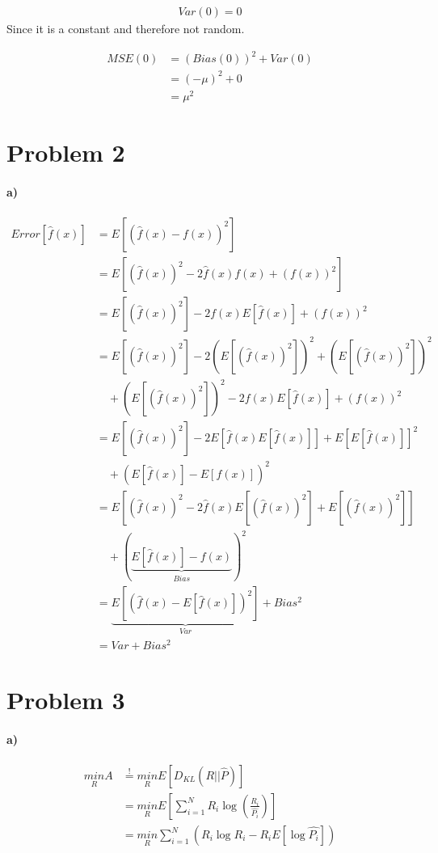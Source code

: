 \documentclass[12pt]{article}
\newcommand{\myexp}[1]{E\left[#1\right]}
\newcommand{\fh}[1][x]{\hat{f}(#1)}
\newcommand{\fhsq}[1][x]{\left(\hat{f}(#1)\right)^2}
\newcommand{\kbd}[2]{D_{KL}(#1||#2)}
\newcommand{\mysum}{\sum_{i=1}^N}
\newcommand{\mymin}{\underset{R}{min}}
\begin{document}
\begin{equation}
\begin{split}
Var(0) = 0
\end{split}
\end{equation}
Since it is a constant and therefore not random.

\begin{equation}
\begin{split}
MSE(0) &= {\left(Bias(0)\right)}^2 + Var(0) \\
       &= {\left(-\mu\right)}^2 + 0 \\
       &= \mu^2
\end{split}
\end{equation}

\section{Problem 2}
\paragraph{a)}
\begin{equation}
\begin{split}
Error\left[\fh\right]
&= \myexp{(\fh - f(x))^2}  \\
&= \myexp{\fhsq - 2\fh f(x) + (f(x))^2} \\
&= \myexp{(\hat{f}(x))^2} - 2f(x)\myexp{\fh} + \left(f(x)\right)^2\\
&= \myexp{\fhsq}-2\left(\myexp{\fhsq}\right)^2 + \left(\myexp{\fhsq}\right)^2\\
&\quad + \left(E[\fhsq]\right)^2- 2f(x)E\left[\fh\right] + \left(f(x)\right)^2\\
&=\myexp{\fhsq} - 2\myexp{\fh\myexp{\fh}} + \myexp{\myexp{\fh}}^2\\
&\quad + \left(\myexp{\fh} - \myexp{f(x)}\right)^2\\
&= \myexp{\fhsq - 2\fh\myexp{\fhsq} + \myexp{\fhsq}}\\
&\quad + \left(\underbrace{\myexp{\fh} - f(x)}_{Bias}\right)^2\\
&= \underbrace{\myexp{\left(\fh - \myexp{\fh}\right)^2}}_{Var} + Bias^2\\
&= Var + Bias^2
\end{split}
\end{equation}
\section{Problem 3}
\paragraph{a)}
\begin{equation}
\begin{split}
\mymin A
&\stackrel{!}{=} \mymin \myexp{\kbd{R}{\hat{P}}}\\
&= \mymin \myexp{\mysum R_i \log \left(\frac{R_i}{\hat{P_i}}\right)}\\
&= \mymin \mysum \left(R_i \log R_i - R_i \myexp{\log \hat{P_i}} \right)
\end{split}
\end{equation}
\end{document}
